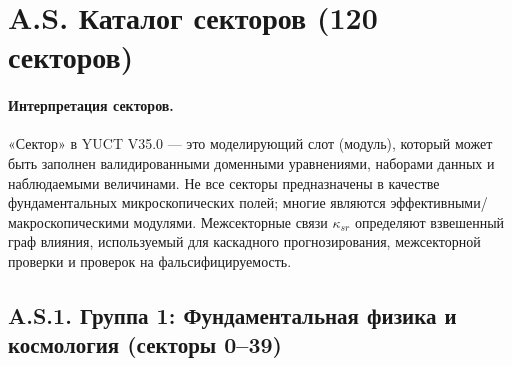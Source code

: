 \documentclass[11pt,a4paper]{article}
\begin{document}
	\tableofcontents
	\newpage
	
	\section*{A.S. Каталог секторов (120 секторов)}
	\label{sec:sector-catalog}
	\paragraph{Интерпретация секторов.}
	«Сектор» в YUCT V35.0 — это моделирующий слот (модуль), который может быть заполнен валидированными доменными уравнениями, наборами данных и наблюдаемыми величинами. Не все секторы предназначены в качестве фундаментальных микроскопических полей; многие являются эффективными/макроскопическими модулями. Межсекторные связи $\kappa_{sr}$ определяют взвешенный граф влияния, используемый для каскадного прогнозирования, межсекторной проверки и проверок на фальсифицируемость.
	
	\subsection*{A.S.1. Группа 1: Фундаментальная физика и космология (секторы 0--39)}
	
\end{document}
